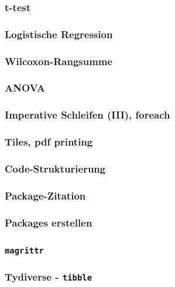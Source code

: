 \documentclass[paper=A4, pagesize, DIV=calc, smallheadings,
fontsize=11pt, expansion=false]{scrreprt}
\begin{document}
\subsubsection*{t-test}

\subsubsection{Logistische Regression}

\subsubsection{Wilcoxon-Rangsumme}

\subsubsection*{ANOVA}

\subsubsection{Imperative Schleifen (III), foreach}

\subsubsection{Tiles, pdf printing}

\subsubsection{Code-Strukturierung}

\subsubsection{Package-Zitation}

\subsubsection{Packages erstellen}

\subsubsection{\texttt{magrittr}}

\subsubsection{Tydiverse - \texttt{tibble}}
\end{document}

